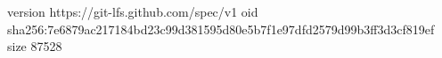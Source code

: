 version https://git-lfs.github.com/spec/v1
oid sha256:7e6879ac217184bd23c99d381595d80e5b7f1e97dfd2579d99b3ff3d3cf819ef
size 87528
